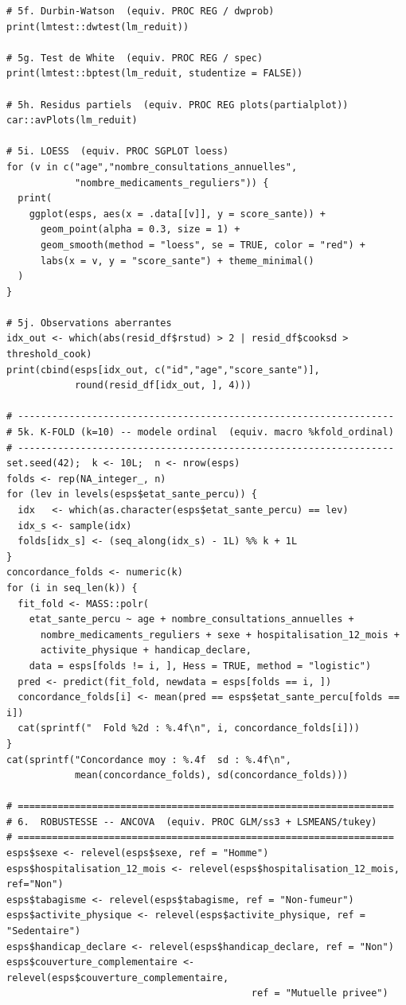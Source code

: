 \documentclass[11pt,a4paper]{memoirerecherche}
\begin{document}
\begin{footnotesize}
\begin{verbatim}
# 5f. Durbin-Watson  (equiv. PROC REG / dwprob)
print(lmtest::dwtest(lm_reduit))

# 5g. Test de White  (equiv. PROC REG / spec)
print(lmtest::bptest(lm_reduit, studentize = FALSE))

# 5h. Residus partiels  (equiv. PROC REG plots(partialplot))
car::avPlots(lm_reduit)

# 5i. LOESS  (equiv. PROC SGPLOT loess)
for (v in c("age","nombre_consultations_annuelles",
            "nombre_medicaments_reguliers")) {
  print(
    ggplot(esps, aes(x = .data[[v]], y = score_sante)) +
      geom_point(alpha = 0.3, size = 1) +
      geom_smooth(method = "loess", se = TRUE, color = "red") +
      labs(x = v, y = "score_sante") + theme_minimal()
  )
}

# 5j. Observations aberrantes
idx_out <- which(abs(resid_df$rstud) > 2 | resid_df$cooksd > threshold_cook)
print(cbind(esps[idx_out, c("id","age","score_sante")],
            round(resid_df[idx_out, ], 4)))

# ------------------------------------------------------------------
# 5k. K-FOLD (k=10) -- modele ordinal  (equiv. macro %kfold_ordinal)
# ------------------------------------------------------------------
set.seed(42);  k <- 10L;  n <- nrow(esps)
folds <- rep(NA_integer_, n)
for (lev in levels(esps$etat_sante_percu)) {
  idx   <- which(as.character(esps$etat_sante_percu) == lev)
  idx_s <- sample(idx)
  folds[idx_s] <- (seq_along(idx_s) - 1L) %% k + 1L
}
concordance_folds <- numeric(k)
for (i in seq_len(k)) {
  fit_fold <- MASS::polr(
    etat_sante_percu ~ age + nombre_consultations_annuelles +
      nombre_medicaments_reguliers + sexe + hospitalisation_12_mois +
      activite_physique + handicap_declare,
    data = esps[folds != i, ], Hess = TRUE, method = "logistic")
  pred <- predict(fit_fold, newdata = esps[folds == i, ])
  concordance_folds[i] <- mean(pred == esps$etat_sante_percu[folds == i])
  cat(sprintf("  Fold %2d : %.4f\n", i, concordance_folds[i]))
}
cat(sprintf("Concordance moy : %.4f  sd : %.4f\n",
            mean(concordance_folds), sd(concordance_folds)))

# ==================================================================
# 6.  ROBUSTESSE -- ANCOVA  (equiv. PROC GLM/ss3 + LSMEANS/tukey)
# ==================================================================
esps$sexe <- relevel(esps$sexe, ref = "Homme")
esps$hospitalisation_12_mois <- relevel(esps$hospitalisation_12_mois, ref="Non")
esps$tabagisme <- relevel(esps$tabagisme, ref = "Non-fumeur")
esps$activite_physique <- relevel(esps$activite_physique, ref = "Sedentaire")
esps$handicap_declare <- relevel(esps$handicap_declare, ref = "Non")
esps$couverture_complementaire <- relevel(esps$couverture_complementaire,
                                           ref = "Mutuelle privee")


\end{verbatim}
\end{footnotesize}
\end{document}
